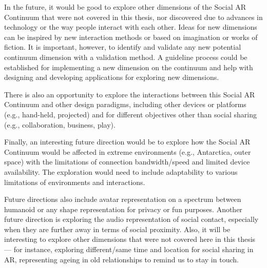 In the future, it would be good to explore other dimensions of the Social AR Continuum that were not covered in this thesis, nor discovered due to advances in technology or the way people interact with each other. Ideas for new dimensions can be inspired by new interaction methods or based on imagination or works of fiction. It is important, however, to identify and validate any new potential continuum dimension with a validation method. A guideline process could be established for implementing a new dimension on the continuum and help with designing and developing applications for exploring new dimensions. 

There is also an opportunity to explore the interactions between this Social AR Continuum and other design paradigms, including other devices or platforms (e.g., hand-held, projected) and for different objectives other than social sharing (e.g., collaboration, business, play).

Finally, an interesting future direction would be to explore how the Social AR Continuum would be affected in extreme environments (e.g., Antarctica, outer space) with the limitations of connection bandwidth/speed and limited device availability. The exploration would need to include adaptability to various limitations of environments and interactions. 

Future directions also include avatar representation on a spectrum between humanoid or any shape representation for privacy or fun purposes. Another future direction is exploring the audio representation of social contact, especially when they are further away in terms of social proximity. Also, it will be interesting to explore other dimensions that were not covered here in this thesis — for instance, exploring different/same time and location for social sharing in AR, representing ageing in old relationships to remind us to stay in touch. 
